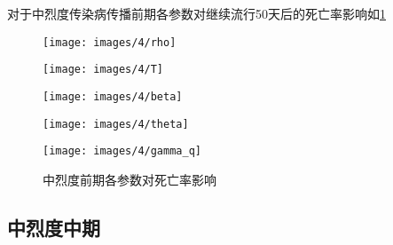 \documentclass[withoutpreface,bwprint]{cumcmthesis}
\begin{document}
对于中烈度传染病传播前期各参数对继续流行50天后的死亡率影响如\cref{fig:9}
\begin{figure}[H]
    \centering
    \begin{minipage}[c]{0.3\textwidth}
        \centering
        \texttt{[image: images/4/rho]}
        \subcaption{$\rho$}
    \end{minipage}
    \begin{minipage}[c]{0.3\textwidth}
        \centering
        \texttt{[image: images/4/T]}
    \end{minipage}
    \begin{minipage}[c]{0.3\textwidth}
        \centering
        \texttt{[image: images/4/beta]}
        \subcaption{$\beta$}
    \end{minipage}

    \begin{minipage}[c]{0.3\textwidth}
        \centering
        \texttt{[image: images/4/theta]}
        \subcaption{$\theta$}
    \end{minipage}
    \begin{minipage}[c]{0.3\textwidth}
        \centering
        \texttt{[image: images/4/gamma\_q]}
    \end{minipage}
    \caption{中烈度前期各参数对死亡率影响}
    \label{fig:9}
    
\end{figure}

\subsection{中烈度中期}
\end{document}
